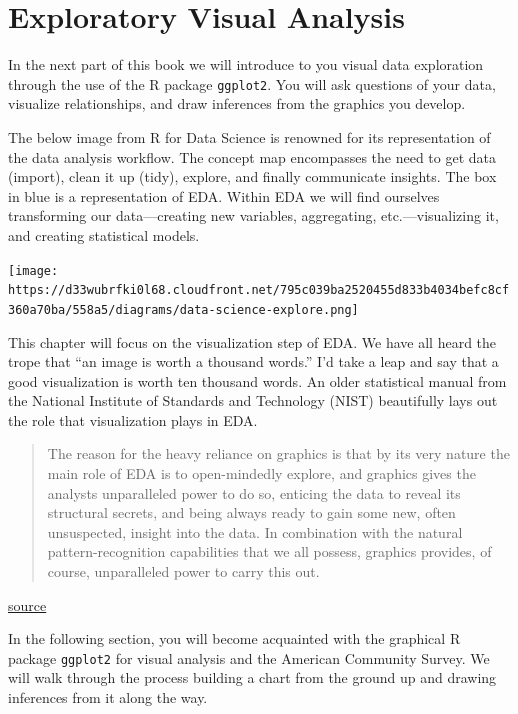 \documentclass[
]{book}
\begin{document}
\hypertarget{exploratory-visual-analysis}{%
\chapter{Exploratory Visual Analysis}\label{exploratory-visual-analysis}}

In the next part of this book we will introduce to you visual data exploration through the use of the R package \texttt{ggplot2}. You will ask questions of your data, visualize relationships, and draw inferences from the graphics you develop.

The below image from R for Data Science is renowned for its representation of the data analysis workflow. The concept map encompasses the need to get data (import), clean it up (tidy), explore, and finally communicate insights. The box in blue is a representation of EDA. Within EDA we will find ourselves transforming our data---creating new variables, aggregating, etc.---visualizing it, and creating statistical models.

\texttt{[image: https://d33wubrfki0l68.cloudfront.net/795c039ba2520455d833b4034befc8cf360a70ba/558a5/diagrams/data-science-explore.png]}

This chapter will focus on the visualization step of EDA. We have all heard the trope that ``an image is worth a thousand words.'' I'd take a leap and say that a good visualization is worth ten thousand words. An older statistical manual from the National Institute of Standards and Technology (NIST) beautifully lays out the role that visualization plays in EDA.

\begin{quote}
The reason for the heavy reliance on graphics is that by its very nature the main role of EDA is to open-mindedly explore, and graphics gives the analysts unparalleled power to do so, enticing the data to reveal its structural secrets, and being always ready to gain some new, often unsuspected, insight into the data. In combination with the natural pattern-recognition capabilities that we all possess, graphics provides, of course, unparalleled power to carry this out.
\end{quote}

\href{https://www.itl.nist.gov/div898/handbook/eda/section1/eda11.htm}{source}

In the following section, you will become acquainted with the graphical R package \texttt{ggplot2} for visual analysis and the American Community Survey. We will walk through the process building a chart from the ground up and drawing inferences from it along the way.
\end{document}
